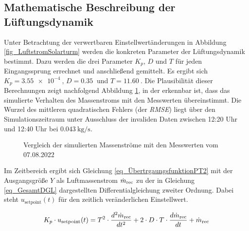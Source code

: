 \subsection{Mathematische Beschreibung der Lüftungsdynamik}
Unter Betrachtung der verwertbaren Einstellwertänderungen in Abbildung \ref{fig_LuftstromSolarturm} werden die konkreten Parameter der Lüftungsdynamik bestimmt.
Dazu werden die drei Parameter $K_p$, $D$ und $T$ für jeden Eingangssprung errechnet und anschließend gemittelt.
Es ergibt sich \linebreak$K_p = \SI{3.55e-4}{}$, $D = \SI{0.35}{}$ und $T = \SI{11.60}{}$.
Die Plausibilität dieser Berechnungen zeigt nachfolgend Abbildung \ref{fig_LuftstromplusSimulativ}, in der erkennbar ist, dass das simulierte Verhalten des Massenstroms mit den Messwerten übereinstimmt.
Die Wurzel des mittleren quadratischen Fehlers (der \textit{RMSE}) liegt über den Simulationszeitraum unter Ausschluss der invaliden Daten zwischen 12:20 Uhr und 12:40 Uhr bei $\SI{0.043}{\kilo\gram\per\second}$.

\begin{figure}[h!]
    \centering
    \setlength{\fboxsep}{1pt}
    \setlength{\fboxrule}{1pt}
    \caption[Vergleich der simulierten Massenströme mit den Messwerten vom 07.08.2022]{Vergleich der simulierten Massenströme mit den Messwerten vom 07.08.2022}
    \label{fig_LuftstromplusSimulativ}
\end{figure}

Im Zeitbereich ergibt sich Gleichung \ref{eq_ÜbertrgaungsfunktionPT2} mit der Ausgangsgröße $Y$ als Luftmassenstrom $\dot{m}_{\mathrm{rec}}$ zu der in Gleichung \ref{eq_GesamtDGL} dargestellten Differentialgleichung zweiter Ordnung.
Dabei steht $u_{\mathrm{setpoint}}(t)$ für den zeitlich veränderlichen Einstellwert.

\begin{equation} \label{eq_GesamtDGL}
    K_p \cdot u_{\mathrm{setpoint}}(t) = T^2 \cdot \frac{d^2\dot{m}_{\mathrm{rec}}}{dt^2} + 2 \cdot D \cdot T \cdot \frac{d\dot{m}_{\mathrm{rec}}}{dt} + \dot{m}_{\mathrm{rec}}
\end{equation}


